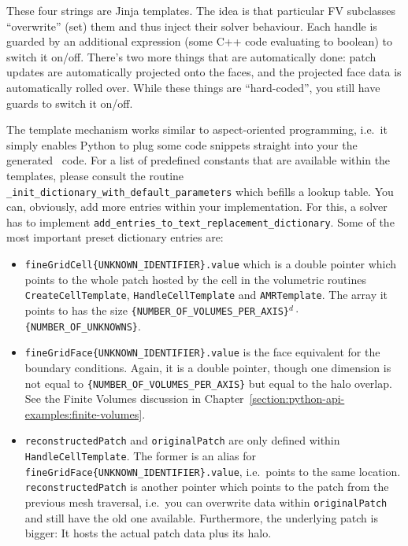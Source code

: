\noindent
These four strings are Jinja templates. The idea is that particular FV
subclasses ``overwrite'' (set) them and thus inject their solver behaviour.
Each handle is guarded by an additional expression (some C++ code evaluating to
boolean) to switch it on/off.
There's two more things that are automatically done: patch updates are
automatically projected onto the faces, and the projected face data is
automatically rolled over.
While these things are ``hard-coded'', you still have guards to switch it
on/off.


The template mechanism works similar to aspect-oriented programming, i.e.~it
simply enables Python to plug some code snippets straight into your the
generated \ExaHyPE\ code. 
For a list of predefined constants that are available within the templates,
please consult the routine
\texttt{\_init\_dictionary\_with\_default\_parameters} which befills a lookup
table.
You can, obviously, add more entries within your implementation.
For this, a solver has to implement
\texttt{add\_entries\_to\_text\_replacement\_dictionary}.
Some of the most important preset dictionary entries are:


\begin{itemize}
  \item \texttt{fineGridCell\{UNKNOWN\_IDENTIFIER\}.value} which is a double
    pointer which points to the whole patch hosted by the cell in the volumetric
    routines \texttt{CreateCellTemplate}, \texttt{HandleCellTemplate} and
    \texttt{AMRTemplate}. The array it points to has the size \linebreak
    \texttt{\{NUMBER\_OF\_VOLUMES\_PER\_AXIS\}}$^d \cdot $
    \texttt{\{NUMBER\_OF\_UNKNOWNS\}}.
  \item \texttt{fineGridFace\{UNKNOWN\_IDENTIFIER\}.value} is the face
    equivalent for the boundary conditions. Again, it is a double pointer,
    though one dimension is not equal to
    \texttt{\{NUMBER\_OF\_VOLUMES\_PER\_AXIS\}} but equal to the halo overlap.
    See the Finite Volumes discussion in
    Chapter~\ref{section:python-api-examples:finite-volumes}.
  \item \texttt{reconstructedPatch} and \texttt{originalPatch} are only defined
    within \texttt{HandleCellTemplate}. The former is an alias for
    \texttt{fineGridFace\{UNKNOWN\_IDENTIFIER\}.value}, i.e.~points to the same
    location. \texttt{reconstructedPatch} is another pointer which points to the
    patch from the previous mesh traversal, i.e.~you can overwrite data
    within \texttt{originalPatch} and still have the old one available.
    Furthermore, the underlying patch is bigger: It hosts the actual patch data
    plus its halo.
\end{itemize}




